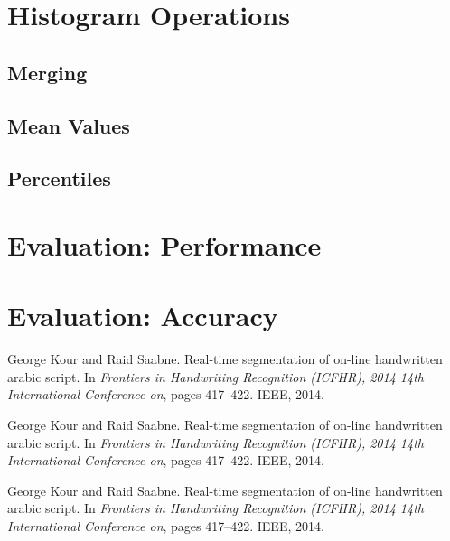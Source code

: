 \documentclass{article}
\theoremstyle{plain}
\theoremstyle{remark}
\begin{document}
\section{Histogram Operations}

\subsection{Merging}

\subsection{Mean Values}

\subsection{Percentiles}

\section{Evaluation: Performance}

\section{Evaluation: Accuracy}



\begin{thebibliography}{1}

George Kour and Raid Saabne.
\newblock Real-time segmentation of on-line handwritten arabic script.
\newblock In {\em Frontiers in Handwriting Recognition (ICFHR), 2014 14th
  International Conference on}, pages 417--422. IEEE, 2014.

George Kour and Raid Saabne.
\newblock Real-time segmentation of on-line handwritten arabic script.
\newblock In {\em Frontiers in Handwriting Recognition (ICFHR), 2014 14th
  International Conference on}, pages 417--422. IEEE, 2014.

George Kour and Raid Saabne.
\newblock Real-time segmentation of on-line handwritten arabic script.
\newblock In {\em Frontiers in Handwriting Recognition (ICFHR), 2014 14th
  International Conference on}, pages 417--422. IEEE, 2014.

\end{thebibliography}
\end{document}
